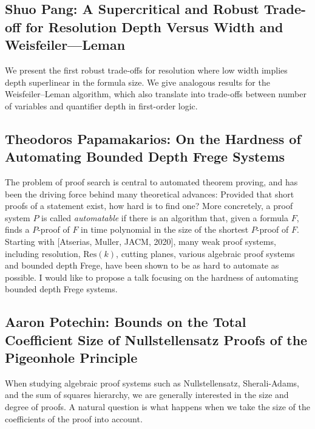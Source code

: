 \documentclass[11pt]{article}
\begin{document}
\subsection*{Shuo Pang: A Supercritical and Robust Trade-off for Resolution Depth Versus Width and Weisfeiler—Leman}\label{Pang}
We present the first robust trade-offs for resolution where low width implies depth superlinear in the formula size. We give analogous results for the Weisfeiler--Leman algorithm, which also translate into trade-offs between number of variables and quantifier depth in first-order logic.

\subsection*{Theodoros Papamakarios: On the Hardness of Automating Bounded Depth Frege Systems}\label{Papamakarios}
The problem of proof search is central to automated theorem proving, and has been the driving force behind many theoretical advances: Provided that short proofs of a statement exist, how hard is to find one? More concretely, a proof system $P$ is called \emph{automatable} if there is an algorithm that, given a formula $F$, finds a $P$-proof of $F$ in time polynomial in the size of the shortest $P$-proof of $F$. Starting with [Atserias, Muller, JACM, 2020], many weak proof systems, including resolution, $\mathrm{Res}(k)$, cutting planes, various algebraic proof systems and bounded depth Frege, have been shown to be as hard to automate as possible. I would like to propose a talk focusing on the hardness of automating bounded depth Frege systems.

\subsection*{Aaron Potechin: Bounds on the Total Coefficient Size of Nullstellensatz Proofs of the Pigeonhole Principle}\label{Potechin}

When studying algebraic proof systems such as Nullstellensatz, Sherali-Adams, and the sum of squares hierarchy, we are generally interested in the size and degree of proofs. A natural question is what happens when we take the size of the coefficients of the proof into account. 
\end{document}
